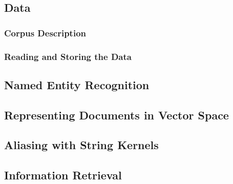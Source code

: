 \subsection{Data}\label{sec:data}
\subsubsection{Corpus Description}\label{sec:description_of_the_castro_archive}

\subsubsection{Reading and Storing the Data}\label{sec:reading_and_storing_the_data}

\subsection{Named Entity Recognition}\label{sec:stanford_named_entity_recognizer}


\subsection{Representing Documents in Vector Space}\label{sec:representing_documents_in_vector_space}


\subsection{Aliasing with String Kernels}\label{sec:aliasing}


\subsection{Information Retrieval}\label{sec:information_retrieval}

